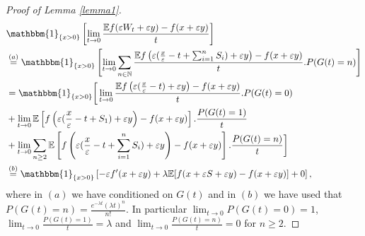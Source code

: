 \documentclass[11pt,letterpaper,reqno]{article}
\theoremstyle{thmstyleone}%
\theoremstyle{thmstyletwo}%
\theoremstyle{thmstylethree}%
\numberwithin{equation}{section}
\begin{document}
\begin{proof}[Proof of Lemma \ref{lemma1}]
\begin{align*}
 &\mathbbm{1}_{\{x>0\}}\left[ \lim_{t \to 0} \frac{\mathbb Ef(\varepsilon W_t+\varepsilon y)-f(x+\varepsilon y)}{t}\right]\\
    &\stackrel{(a)}{=}\mathbbm{1}_{\{x>0\}}\left[\lim_{t \to 0}\sum_{n \in \mathbb{N}}\frac{\mathbb E f\left(\varepsilon(\frac{x}{\varepsilon}-t+\sum_{i=1}^{n}S_i)+\varepsilon y\right)-f(x+\varepsilon y)}{t}.P(G(t)=n)\right]\\
    &=\mathbbm{1}_{\{x>0\}}\bigg[\lim_{t \to 0}\frac{\mathbb E f\left(\varepsilon(\frac{x}{\varepsilon}-t)+\varepsilon y\right)-f(x+\varepsilon y)}{t}.P(G(t)=0)\\
    &+\lim_{t \to 0}\mathbb E \left[ f\left(\varepsilon(\frac{x}{\varepsilon}-t+S_1)+\varepsilon y\right)-f(x+\varepsilon y)\right].\frac{P(G(t)=1)}{t}\\
    &+\lim_{t \to 0}\sum_{n \geq 2}\mathbb E \left[ f\left(\varepsilon(\frac{x}{\varepsilon}-t+\sum_{i=1}^n S_i)+\varepsilon y\right)-f(x+\varepsilon y)\right].\frac{P(G(t)=n)}{t}\bigg]\\
    &\stackrel{(b)}{=}\mathbbm{1}_{\{x>0\}}\left[ -\varepsilon f'(x+\varepsilon y)+\lambda \mathbb E[f(x+\varepsilon S+\varepsilon y)-f(x+\varepsilon y)]+0\right],
\end{align*}
where in $(a)$ we have conditioned on $G(t)$ and in $(b)$ we have used that $P(G(t)=n)=\frac{e^{-\lambda t}(\lambda t)^n}{n!}$. In particular $\lim_{t \to 0}P(G(t)=0)=1$, $\lim_{t \to 0}\frac{P(G(t)=1)}{t}=\lambda$ and $\lim_{t \to 0}\frac{P(G(t)=n)}{t}=0$ for $n \geq 2$.


\end{proof}
\end{document}
